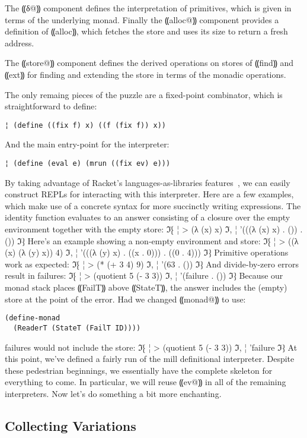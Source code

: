The ⸨δ@⸩ component defines the interpretation of primitives, which is given in
terms of the underlying monad.  Finally the ⸨alloc@⸩ component provides a
definition of ⸨alloc⸩, which fetches the store and uses its size to return a
fresh address.

The ⸨store@⸩ component defines the derived operations on stores of ⸨find⸩ and
⸨ext⸩ for finding and extending the store in terms of the monadic operations.

The only remaing pieces of the puzzle are a fixed-point combinator, which is
straightforward to define:
\begin{lstlisting}
¦ (define ((fix f) x) ((f (fix f)) x))
\end{lstlisting}
And the main entry-point for the interpreter:
\begin{lstlisting}
¦ (define (eval e) (mrun ((fix ev) e)))
\end{lstlisting}
By taking advantage of Racket's languages-as-libraries
features~\cite{dvanhorn:TobinHochstadt2011Languages}, we can easily construct
REPLs for interacting with this interpreter.  Here are a few examples, which
make use of a concrete syntax for more succinctly writing expressions. The
identity function evaluates to an answer consisting of a closure over the empty
environment together with the empty store:
ℑ⁅
¦ > (λ (x) x)
ℑ,
¦ '(((λ (x) x) . ()) . ())
ℑ⁆
Here's an example showing a non-empty environment and store:
ℑ⁅
¦ > ((λ (x) (λ (y) x)) 4)
ℑ,
¦ '(((λ (y) x) . ((x . 0))) . ((0 . 4)))
ℑ⁆
Primitive operations work as expected:
ℑ⁅
¦ > (* (+ 3 4) 9)
ℑ,
¦ '(63 . ())
ℑ⁆
And divide-by-zero errors result in failures:
ℑ⁅
¦ > (quotient 5 (- 3 3))
ℑ,
¦ '(failure . ())
ℑ⁆
Because our monad stack places ⸨FailT⸩ above ⸨StateT⸩, the answer includes the
(empty) store at the point of the error. Had we changed ⸨monad@⸩ to use:
\begin{lstlisting}
(define-monad 
  (ReaderT (StateT (FailT ID))))
\end{lstlisting}
failures would not include the store:
ℑ⁅
¦ > (quotient 5 (- 3 3))
ℑ,
¦ 'failure
ℑ⁆
At this point, we've defined a fairly run of the mill definitional interpreter.
Despite these pedestrian beginnings, we essentially have the complete skeleton
for everything to come.  In particular, we will reuse ⸨ev@⸩ in all of the
remaining interpreters.  Now let's do something a bit more enchanting.

\subsection{Collecting Variations}\label{s:collecting}

